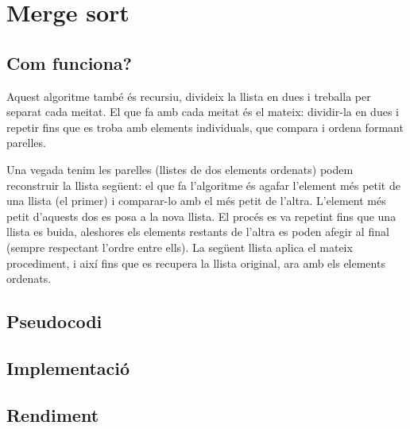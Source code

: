 \chapter{Merge sort}

\section{Com funciona?}
Aquest algoritme també és recursiu, divideix la llista en dues i treballa per separat cada meitat. El que fa amb cada meitat és el mateix: dividir-la en dues i repetir fins que es troba amb elements individuals, que compara i ordena formant parelles.

Una vegada tenim les parelles (llistes de dos elements ordenats) podem reconstruir la llista següent: el que fa l'algoritme és agafar l'element més petit de una llista (el primer) i comparar-lo amb el més petit de l'altra. L'element més petit d'aquests dos es posa a la nova llista. El procés es va repetint fins que una llista es buida, aleshores els elements restants de l'altra es poden afegir al final (sempre respectant l'ordre entre ells).
La següent llista aplica el mateix procediment, i així fins que es recupera la llista original, ara amb els elements ordenats.
\section{Pseudocodi}
\section{Implementació}

\section{Rendiment}
